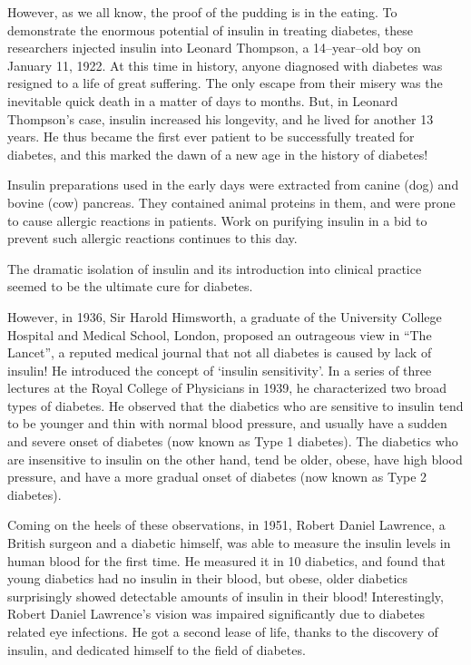 However, as we all know, the proof of the pudding is in the eating. To demonstrate the enormous potential of insulin in treating diabetes, these researchers injected insulin into Leonard Thompson, a 14–year–old boy on January 11, 1922. At this time in history, anyone diagnosed with diabetes was resigned to a life of great suffering. The only es\-cape from their misery was the inevitable quick death in a matter of days to months. But, in Leonard Thompson’s case, insulin increased his longevity, and he lived for another 13 years. He thus became the first ever patient to be successfully treated for diabetes, and this marked the dawn of a new age in the history of diabetes!

Insulin preparations used in the early days were extracted from canine (dog) and bovine (cow) pancreas. They contained animal proteins in them, and were prone to cause allergic rea\-ctions in patients. Work on purifying insulin in a bid to prevent such allergic reactions continues to this day.

The dramatic isolation of insulin and its introduction into clinical practice seemed to be the ultimate cure for diabetes.

However, in 1936, Sir Harold Himsworth, a graduate of the University College Hospital and Medical School, London, proposed an outrageous view in “The Lancet”, a reputed medical journal that not all diabetes is caused by lack of insulin! He introduced the concept of ‘insulin sensitivity’. In a series of three lectures at the Royal College of Physicians in 1939, he characte\-rized two broad types of diabetes. He observed that the diabe\-tics who are sensitive to insulin tend to be younger and thin with normal blood pressure, and usually have a sudden and severe onset of diabetes (now known as Type 1 diabetes). The diabetics who are insensitive to insulin on the other hand, tend be older, obese, have high blood pressure, and have a more gradual onset of diabetes (now known as Type 2 diabetes).

Coming on the heels of these observations, in 1951, Robert Daniel Lawrence, a British surgeon and a diabetic himself, was able to measure the insulin levels in human blood for the first time. He measured it in 10 diabetics, and found that young dia\-betics had no insulin in their blood, but obese, older diabetics surprisingly showed detectable amounts of insulin in their blood! Interestingly, Robert Daniel Lawre\-nce’s vision was impaired significantly due to diabetes related eye infections. He got a second lease of life, thanks to the disco\-very of insulin, and dedicated himself to the field of diabetes.

